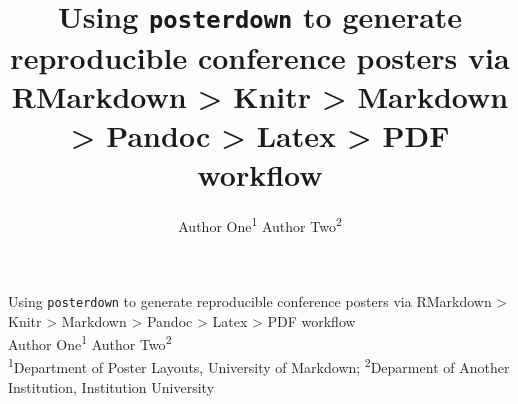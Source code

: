 \documentclass[article,30pt,extrafontsizes]{memoir}
\author{Author One\textsuperscript{1} Author Two\textsuperscript{2}}
\title{Using \texttt{posterdown} to generate reproducible conference posters
via RMarkdown \textgreater{} Knitr \textgreater{} Markdown
\textgreater{} Pandoc \textgreater{} Latex \textgreater{} PDF workflow}
\begin{document}
\begin{mdframed}[style=brentsmdfstyle]
\renewcommand\footnoterule{}
\renewcommand{\thempfootnote}{\footnotesize\color{red}{\arabic{mpfootnote}}}

\begingroup
  \centering
  \color{red}
\vspace{0.5in}
  \Huge{Using \texttt{posterdown} to generate reproducible conference posters
via RMarkdown \textgreater{} Knitr \textgreater{} Markdown
\textgreater{} Pandoc \textgreater{} Latex \textgreater{} PDF workflow} \\[0.3in]
  \color{cyan} \Large{Author One\textsuperscript{1} Author Two\textsuperscript{2}} \\[0.2in]
  \color{white} \large{\textsuperscript{1}Department of Poster Layouts, University of Markdown;
\textsuperscript{2}Deparment of Another Institution, Institution
University} \par
  \vspace{0.2in}

  \endgroup
\end{mdframed}
\end{document}
